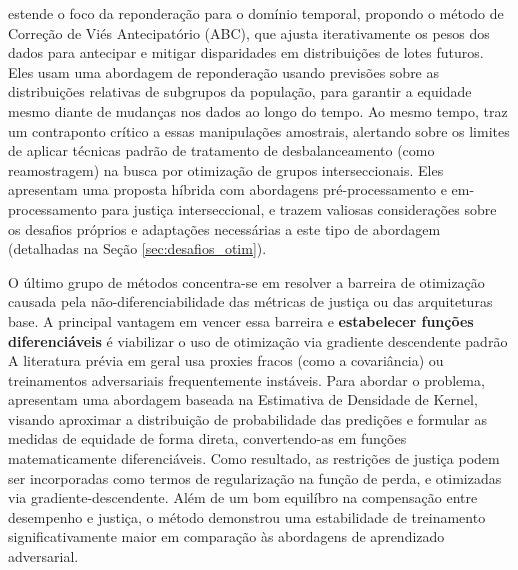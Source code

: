 \citet{almuzaini2022abcinml} estende o foco da reponderação para o domínio temporal, propondo o método de Correção de Viés Antecipatório (ABC), que ajusta iterativamente os pesos dos dados para antecipar e mitigar disparidades em distribuições de lotes futuros. Eles usam uma abordagem de reponderação usando previsões sobre as distribuições relativas de subgrupos da população, para garantir a equidade mesmo diante de mudanças nos dados ao longo do tempo. Ao mesmo tempo, \citet{wang2022towards} traz um contraponto crítico a essas manipulações amostrais, alertando sobre os limites de aplicar técnicas padrão de tratamento de desbalanceamento (como reamostragem) na busca por otimização de grupos interseccionais. Eles apresentam uma proposta híbrida com abordagens pré-processamento e em-processamento para justiça interseccional, e trazem valiosas considerações sobre os desafios próprios e adaptações necessárias a este tipo de abordagem (detalhadas na Seção \ref{sec:desafios_otim}).

O último grupo de métodos concentra-se em resolver a barreira de otimização causada pela não-diferenciabilidade das métricas de justiça ou das arquiteturas base. A principal vantagem em vencer essa barreira e \textbf{estabelecer funções diferenciáveis} é viabilizar o uso de otimização via gradiente descendente padrão
A literatura prévia em geral usa proxies fracos (como a covariância) ou treinamentos adversariais frequentemente instáveis. Para abordar o problema, \citet{cho2020fair} apresentam uma abordagem baseada na Estimativa de Densidade de Kernel, visando aproximar a distribuição de probabilidade das predições e formular as medidas de equidade de forma direta, convertendo-as em funções matematicamente diferenciáveis. Como resultado, as restrições de justiça podem ser incorporadas como termos de regularização na função de perda, e otimizadas via gradiente-descendente.
Além de um bom equilíbro na compensação entre desempenho e justiça, o método demonstrou uma estabilidade de treinamento significativamente maior em comparação às abordagens de aprendizado adversarial.

